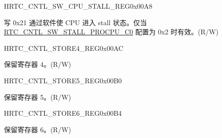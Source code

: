 \begin{register}{H}{RTC\_CNTL\_SW\_CPU\_STALL\_REG}{0x00A8}\label{regdesc:RTCCNTLSWCPUSTALLREG}
%
%
\regnewline%
\begin{regdesc}\begin{reglist}
\label{fielddesc:RTCCNTLSWSTALLPROCPUC1}\item [RTC\_CNTL\_SW\_STALL\_PROCPU\_C1] 写 0x21 通过软件使 CPU 进入 stall 状态。仅当 \hyperref[fielddesc:RTCCNTLSWSTALLPROCPUC0]{RTC\_CNTL\_SW\_STALL\_PROCPU\_C0} 配置为 0x2 时有效。(R/W)
\end{reglist}\end{regdesc}
\end{register}


\begin{register}{H}{RTC\_CNTL\_STORE4\_REG}{0x00AC}\label{regdesc:RTCCNTLSTORE4REG}
%
\regnewline%
\begin{regdesc}\begin{reglist}
\label{fielddesc:RTCCNTLSCRATCH4}\item [RTC\_CNTL\_SCRATCH4] 保留寄存器 4。(R/W)
\end{reglist}\end{regdesc}
\end{register}


\begin{register}{H}{RTC\_CNTL\_STORE5\_REG}{0x00B0}\label{regdesc:RTCCNTLSTORE5REG}
%
\regnewline%
\begin{regdesc}\begin{reglist}
\label{fielddesc:RTCCNTLSCRATCH5}\item [RTC\_CNTL\_SCRATCH5] 保留寄存器 5。(R/W)
\end{reglist}\end{regdesc}
\end{register}


\begin{register}{H}{RTC\_CNTL\_STORE6\_REG}{0x00B4}\label{regdesc:RTCCNTLSTORE6REG}
%
\regnewline%
\begin{regdesc}\begin{reglist}
\label{fielddesc:RTCCNTLSCRATCH6}\item [RTC\_CNTL\_SCRATCH6] 保留寄存器 6。(R/W)
\end{reglist}\end{regdesc}
\end{register}


